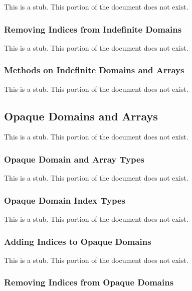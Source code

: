 This is a stub.  This portion of the document does not exist.

\subsubsection{Removing Indices from Indefinite Domains}
\label{Removing_Indices_from_Indefinite_Domains}

This is a stub.  This portion of the document does not exist.

\subsubsection{Methods on Indefinite Domains and Arrays}
\label{Methods_on_Indefinite_Domains_and_Arrays}

This is a stub.  This portion of the document does not exist.

\subsection{Opaque Domains and Arrays}
\label{Opaque_Domains_and_Arrays}

This is a stub.  This portion of the document does not exist.

\subsubsection{Opaque Domain and Array Types}
\label{Opaque_Domain_and_Array_Types}

This is a stub.  This portion of the document does not exist.

\subsubsection{Opaque Domain Index Types}
\label{Opaque_Domain_Index_Types}

This is a stub.  This portion of the document does not exist.

\subsubsection{Adding Indices to Opaque Domains}
\label{Adding_Indices_to_Opaque_Domains}

This is a stub.  This portion of the document does not exist.

\subsubsection{Removing Indices from Opaque Domains}
\label{Removing_Indices_from_Opaque_Domains}

